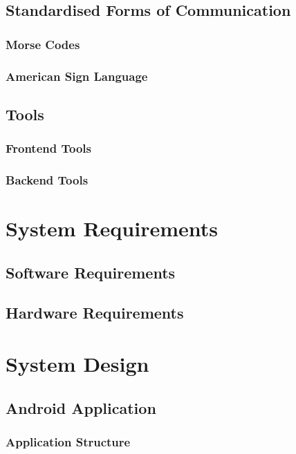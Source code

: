 \documentclass{article}
\begin{document}
		\subsection{Standardised Forms of Communication}
			\subsubsection{Morse Codes}
			\subsubsection{American Sign Language}
		\subsection{Tools}
			\subsubsection{Frontend Tools}
			\subsubsection{Backend Tools}

	\newpage


	\section{System Requirements}
	
		\subsection{Software Requirements}
			
		\subsection{Hardware Requirements}

	\newpage


	\section{System Design}

		\subsection{Android Application}
			\subsubsection{Application Structure}
\end{document}
